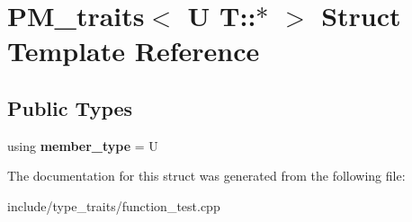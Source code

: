 \hypertarget{structPM__traits_3_01U_01T_1_1_5_01_4}{}\section{P\+M\+\_\+traits$<$ U T\+:\+:$\ast$ $>$ Struct Template Reference}
\label{structPM__traits_3_01U_01T_1_1_5_01_4}
\subsection*{Public Types}
\begin{DoxyCompactItemize}
\item 
\mbox{\label{structPM__traits_3_01U_01T_1_1_5_01_4_a4a1b5066b44a72dee9aa300d92da0d56}} 
using {\bfseries member\+\_\+type} = U
\end{DoxyCompactItemize}


The documentation for this struct was generated from the following file\+:\begin{DoxyCompactItemize}
\item 
include/type\+\_\+traits/function\+\_\+test.\+cpp\end{DoxyCompactItemize}
